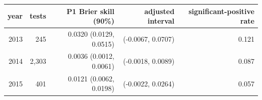 \begin{tabular}{rrrrr}
\toprule
year & tests & P1 Brier skill (90\%) & adjusted interval & significant-positive rate \\
\midrule
2013 & 245 & 0.0320 (0.0129, 0.0515) & (-0.0067, 0.0707) & 0.121 \\
2014 & 2,303 & 0.0036 (0.0012, 0.0061) & (-0.0018, 0.0089) & 0.087 \\
2015 & 401 & 0.0121 (0.0062, 0.0198) & (-0.0022, 0.0264) & 0.057 \\
\bottomrule
\end{tabular}
